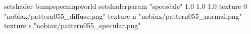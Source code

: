 setshader bumpspecmapworld
setshaderparam "specscale" 1.0 1.0 1.0
   texture 0 "nobiax/pattern055_diffuse.png"
   texture n "nobiax/pattern055_normal.png"
   texture s "nobiax/pattern055_specular.png"